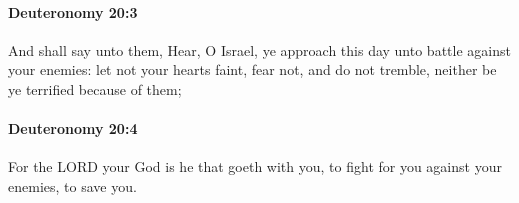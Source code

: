 		\paragraph{Deuteronomy 20:3} %
			\label{DEUTERONOMY-20-3}

			And shall say unto them, Hear, O Israel, ye approach this day unto battle against your enemies: let not your hearts faint, fear not, and do not tremble, neither be ye terrified because of them;


		\paragraph{Deuteronomy 20:4} %
			\label{DEUTERONOMY-20-4}

			For the LORD your God is he that goeth with you, to fight for you against your enemies, to save you.



